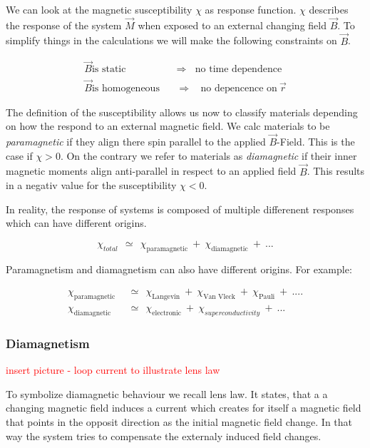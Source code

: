 \documentclass[10pt]{report}
\numberwithin{equation}{chapter}
\begin{document}
We can look at the magnetic susceptibility $\chi$ as response function. $\chi$ describes the response of the system $\vec{M}$ when exposed to an external changing field $\vec{B}$.
To simplify things in the calculations we will make the following constraints on $\vec{B}$.

\begin{align*}
  \vec{B} \text{is static} ~~~~ &  \Rightarrow  ~~~~ \text{no time dependence}\\
  \vec{B} \text{is homogeneous} ~~~~ & \Rightarrow  ~~~~ \text{no depencence on}\ \vec{r}
\end{align*}


The definition of the susceptibility allows us now to classify materials depending on how the respond to an external magnetic field. We calc materials to be \textit{paramagnetic} if they align there spin parallel to the applied $\vec{B}$-Field. This is the case if $\chi > 0$. On the contrary we refer to materials as \textit{diamagnetic} if their inner magnetic moments align anti-parallel in respect to an applied field $\vec{B}$. This results in a negativ value for the susceptibility $\chi < 0$.

In reality, the response of systems is composed of multiple differenent responses which can have different origins.

\begin{equation}
  \chi_{total} ~~≃~~ \chi_\text{paramagnetic} ~+~ \chi_\text{diamagnetic} ~+~ ...
\end{equation}

Paramagnetism and diamagnetism can also have different origins. For example:

\begin{align*}
  \chi_\text{paramagnetic} ~~& ≃~~ \chi_\text{Langevin} ~+~ \chi_\text{Van Vleck} ~+~ \chi_\text{Pauli} ~+~ ....\\
  \chi_\text{diamagnetic} ~~& ≃~~ \chi_\text{electronic} ~+~ \chi_{superconductivity} ~+~ ...  
\end{align*}



\subsubsection{Diamagnetism}

\textcolor{red}{insert picture - loop current to illustrate lens law}

To symbolize diamagnetic behaviour we recall lens law. It states, that a a changing magnetic field induces a current which creates for itself a magnetic field that points in the opposit direction as the initial magnetic field change. In that way the system tries to compensate the externaly induced field changes.
\end{document}
